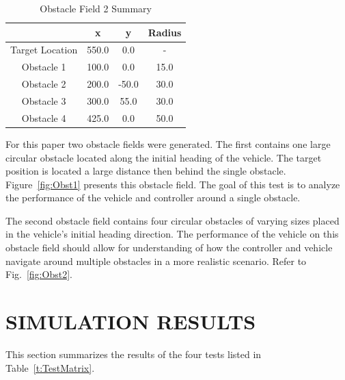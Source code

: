 \documentclass[12pt,twocolumn]{article}
\begin{document}
\begin{table}
\begin{center}
	\begin{tabular}{||c|c|c|c||} 
		\hline
		& x & y & Radius\\
		\hline
		Target Location  & 550.0 & 0.0 & -\\ 
		\hline
		Obstacle 1 & 100.0 & 0.0 & 15.0\\
		\hline
		Obstacle 2 & 200.0 & -50.0 & 30.0\\
		\hline
		Obstacle 3 & 300.0 & 55.0 & 30.0\\
		\hline
		Obstacle 4 & 425.0 & 0.0 & 50.0\\
		\hline
	\end{tabular}
\end{center}
\caption{Obstacle Field 2 Summary}
\label{t:Obst2Summary}
\end{table}

For this paper two obstacle fields were generated. The first contains one large circular obstacle located along the initial heading of the vehicle. The target position is located a large distance then behind the single obstacle. Figure~\ref{fig:Obst1} presents this obstacle field. The goal of this test is to analyze the performance of the vehicle and controller around a single obstacle. 

The second obstacle field contains four circular obstacles of varying sizes placed in the vehicle’s initial heading direction. The performance of the vehicle on this obstacle field should allow for understanding of how the controller and vehicle navigate around multiple obstacles in a more realistic scenario. Refer to Fig.~\ref{fig:Obst2}.


\section{SIMULATION RESULTS}\label{s:results}

This section summarizes the results of the four tests listed in Table~\ref{t:TestMatrix}. 
\end{document}
